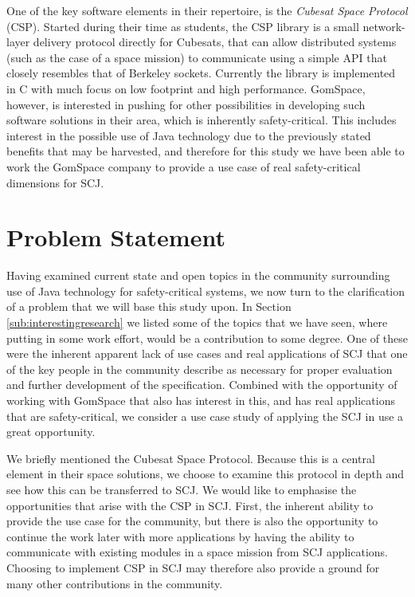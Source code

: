 One of the key software elements in their repertoire, is the \textit{Cubesat Space Protocol} (CSP). Started during their time as students, the CSP library is a small network-layer delivery protocol directly for Cubesats, that can allow distributed systems (such as the case of a space mission) to communicate using a simple API that closely resembles that of Berkeley sockets. Currently the library is implemented in C with much focus on low footprint and high performance. GomSpace, however, is interested in pushing for other possibilities in developing such software solutions in their area, which is inherently safety-critical. This includes interest in the possible use of Java technology due to the previously stated benefits that may be harvested, and therefore for this study we have been able to work the GomSpace company to provide a use case of real safety-critical dimensions for SCJ.


\section{Problem Statement} %
\label{sec:problem_statement}
Having examined current state and open topics in the community surrounding use of Java technology for safety-critical systems, we now turn to the clarification of a problem that we will base this study upon. In Section \ref{sub:interestingresearch} we listed some of the topics that we have seen, where putting in some work effort, would be a contribution to some degree. One of these were the inherent apparent lack of use cases and real applications of SCJ that one of the key people in the community describe as necessary for proper evaluation and further development of the specification. Combined with the opportunity of working with GomSpace that also has interest in this, and has real applications that are safety-critical, we consider a use case study of applying the SCJ in use a great opportunity.

We briefly mentioned the Cubesat Space Protocol. Because this is a central element in their space solutions, we choose to examine this protocol in depth and see how this can be transferred to SCJ. We would like to emphasise the opportunities that arise with the CSP in SCJ. First, the inherent ability to provide the use case for the community, but there is also the opportunity to continue the work later with more applications by having the ability to communicate with existing modules in a space mission from SCJ applications. Choosing to implement CSP in SCJ may therefore also provide a ground for many other contributions in the community.

